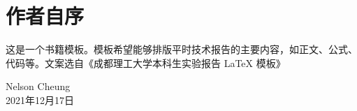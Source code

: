 \chapter*{作者自序}

这是一个书籍模板。模板希望能够排版平时技术报告的主要内容，如正文、公式、代码等。文案选自《成都理工大学本科生实验报告 LaTeX 模板》

\begin{flushright}
    Nelson Cheung\\
    2021年12月17日
\end{flushright}